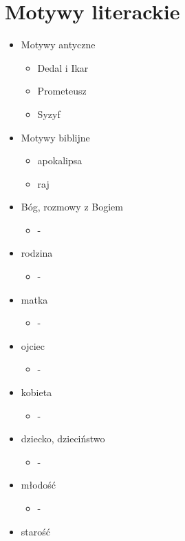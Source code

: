 \documentclass[a4paper]{article}
\begin{document}
\section{Motywy literackie}
\begin{itemize}
    \item Motywy antyczne \begin{itemize}
        \item Dedal i Ikar
        \item Prometeusz
        \item Syzyf
    \end{itemize}
    \item Motywy biblijne \begin{itemize}
        \item apokalipsa
        \item raj
    \end{itemize}
    \item Bóg, rozmowy z Bogiem \begin{itemize}
        \item -
    \end{itemize}
    \item rodzina \begin{itemize}
        \item -
    \end{itemize}
    \item matka \begin{itemize}
        \item -
    \end{itemize}
    \item ojciec \begin{itemize}
        \item -
    \end{itemize}
    \item kobieta \begin{itemize}
        \item -
    \end{itemize}
    \item dziecko, dzieciństwo \begin{itemize}
        \item -
    \end{itemize}
    \item młodość \begin{itemize}
        \item -
    \end{itemize}
    \item starość \begin{itemize}

\end{itemize}
\end{itemize}
\end{document}
